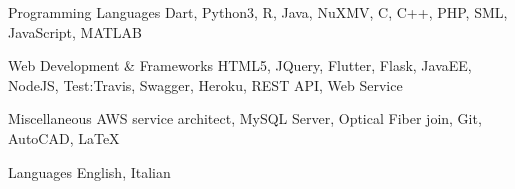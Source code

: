 

\begin{cvskills}

  \cvskill
    {Programming Languages} %
    {Dart, Python3, R, Java, NuXMV, C, C++, PHP, SML, JavaScript, MATLAB} %

  \cvskill
    {Web Development \& Frameworks} %
    {HTML5, JQuery, Flutter, Flask, JavaEE, NodeJS, Test:Travis, Swagger, Heroku, REST API, Web Service} %

  \cvskill
    {Miscellaneous} %
    {AWS service architect, MySQL Server, Optical Fiber join, Git, AutoCAD, LaTeX} %

  \cvskill
    {Languages} %
    {English, Italian} %

\end{cvskills}
